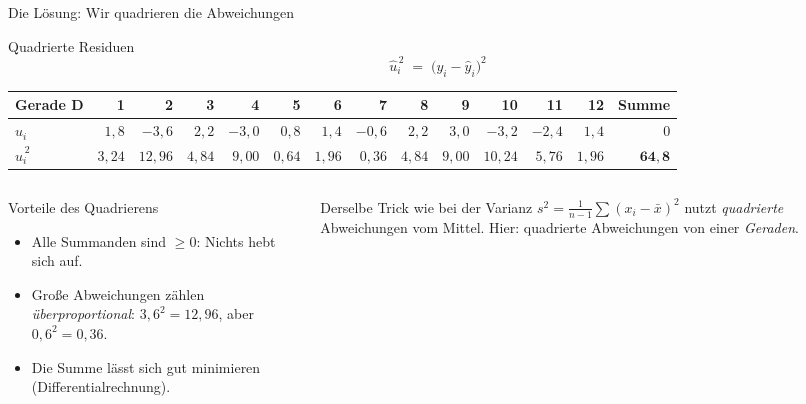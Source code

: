 \documentclass[aspectratio=169,11pt]{beamer}
\begin{document}
\begin{frame}{Die Lösung: Wir quadrieren die Abweichungen}
  \begin{block}{Quadrierte Residuen}
    \[
      \hat{u}_i^{\,2} \;=\; \bigl(y_i - \hat{y}_i\bigr)^{2}
    \]
  \end{block}

  \begin{center}
    \scriptsize
    \renewcommand{\arraystretch}{1.1}
    \begin{tabular}{l*{12}{r}r}
      \toprule
      Gerade D & 1 & 2 & 3 & 4 & 5 & 6 & 7 & 8 & 9 & 10 & 11 & 12 & Summe \\
      \midrule
      $\hat{u}_i$      & $1{,}8$  & $-3{,}6$  & $2{,}2$  & $-3{,}0$ & $0{,}8$  & $1{,}4$  & $-0{,}6$ & $2{,}2$  & $3{,}0$  & $-3{,}2$  & $-2{,}4$ & $1{,}4$  & $0$ \\
      $\hat{u}_i^{\,2}$ & $3{,}24$ & $12{,}96$ & $4{,}84$ & $9{,}00$ & $0{,}64$ & $1{,}96$ & $0{,}36$ & $4{,}84$ & $9{,}00$ & $10{,}24$ & $5{,}76$ & $1{,}96$ & $\mathbf{64{,}8}$ \\
      \bottomrule
    \end{tabular}
  \end{center}

  \begin{columns}[T]
    \begin{column}{0.55\textwidth}
      \begin{block}{Vorteile des Quadrierens}
        \begin{itemize}
          \item Alle Summanden sind $\ge 0$: Nichts hebt sich auf.
          \item Große Abweichungen zählen \emph{überproportional}:
                $3{,}6^{2} = 12{,}96$, aber $0{,}6^{2} = 0{,}36$.
          \item Die Summe lässt sich gut minimieren (Differentialrechnung).
        \end{itemize}
      \end{block}
    \end{column}
    \begin{column}{0.43\textwidth}
      \begin{exampleblock}{Derselbe Trick wie bei der Varianz}
        $s^{2} = \frac{1}{n-1}\sum (x_i - \bar{x})^{2}$ nutzt \emph{quadrierte}
        Abweichungen vom Mittel. Hier: quadrierte Abweichungen von einer
        \emph{Geraden}.
      \end{exampleblock}
    \end{column}
  \end{columns}
\end{frame}
\end{document}
